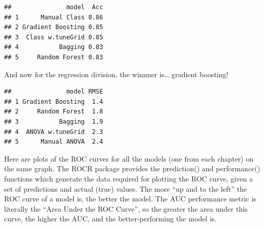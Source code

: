 \documentclass[
]{book}
\newenvironment{Shaded}{\begin{snugshade}}{\end{snugshade}}
\newcommand{\DataTypeTok}[1]{\textcolor[rgb]{0.13,0.29,0.53}{#1}}
\newcommand{\DecValTok}[1]{\textcolor[rgb]{0.00,0.00,0.81}{#1}}
\newcommand{\KeywordTok}[1]{\textcolor[rgb]{0.13,0.29,0.53}{\textbf{#1}}}
\newcommand{\NormalTok}[1]{#1}
\newcommand{\OperatorTok}[1]{\textcolor[rgb]{0.81,0.36,0.00}{\textbf{#1}}}
\newcommand{\StringTok}[1]{\textcolor[rgb]{0.31,0.60,0.02}{#1}}
\begin{document}
\begin{verbatim}
##               model  Acc
## 1      Manual Class 0.86
## 2 Gradient Boosting 0.85
## 3  Class w.tuneGrid 0.85
## 4           Bagging 0.83
## 5     Random Forest 0.83
\end{verbatim}

And now for the regression division, the winnner is\ldots{} gradient boosting!

\begin{Shaded}
\end{Shaded}

\begin{verbatim}
##               model RMSE
## 1 Gradient Boosting  1.4
## 2     Random Forest  1.8
## 3           Bagging  1.9
## 4  ANOVA w.tuneGrid  2.3
## 5      Manual ANOVA  2.4
\end{verbatim}

Here are plots of the ROC curves for all the models (one from each chapter) on the same graph. The ROCR package provides the prediction() and performance() functions which generate the data required for plotting the ROC curve, given a set of predictions and actual (true) values.
The more ``up and to the left'' the ROC curve of a model is, the better the model. The AUC performance metric is literally the ``Area Under the ROC Curve'', so the greater the area under this curve, the higher the AUC, and the better-performing the model is.
\end{document}
